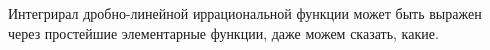 
 	Интегрирал дробно-линейной иррациональной функции может быть  выражен через простейшие элементарные функции, даже можем сказать, какие.
 